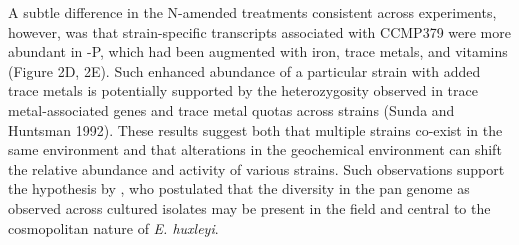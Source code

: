 A subtle difference in the N-amended treatments consistent across experiments, however, was that strain-specific transcripts associated with CCMP379 were more abundant in -P, which had been augmented with iron, trace metals, and vitamins (Figure 2D, 2E). Such enhanced abundance of a particular strain with added trace metals is potentially supported by the heterozygosity observed in trace metal-associated genes \citep{Read2013} and trace metal quotas across strains (Sunda and Huntsman 1992). These results suggest both that multiple strains co-exist in the same environment and that alterations in the geochemical environment can shift the relative abundance and activity of various strains. Such observations support the hypothesis by \citet{Read2013}, who postulated that the diversity in the pan genome as observed across cultured isolates may be present in the field and central to the cosmopolitan nature of \textit{E. huxleyi}. \par


